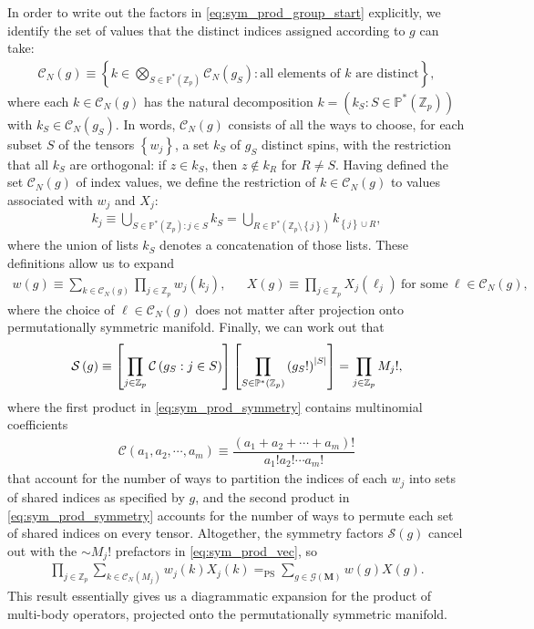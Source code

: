 \documentclass[nofootinbib,notitlepage,11pt]{revtex4-2}
\renewcommand{\t}{\text} %
\newcommand{\f}[2]{\dfrac{#1}{#2}} %
\newcommand{\p}[1]{\left(#1\right)} %
\renewcommand{\sp}[1]{\left[#1\right]} %
\renewcommand{\set}[1]{\left\{#1\right\}} %
\newcommand{\m}{\bm} %
\newcommand{\1}{\mathds{1}}
\newcommand{\C}{\mathcal{C}}
\newcommand{\G}{\mathcal{G}}
\renewcommand{\S}{\mathcal{S}}
\newcommand{\PP}{\mathbb{P}}
\newcommand{\ZZ}{\mathbb{Z}}
\newcommand{\EQPS}{=_{\text{PS}}}
\begin{document}
In order to write out the factors in \eqref{eq:sym_prod_group_start}
explicitly, we identify the set of values that the distinct indices
assigned according to $g$ can take:
\begin{align}
  \C_N\p{g}
  \equiv \set{ k \in \bigotimes_{S\in\PP^*\p{\ZZ_p}} \C_N\p{g_S}
    : \t{all elements of $k$ are distinct} },
  \label{eq:index_values}
\end{align}
where each $k\in\C_N\p{g}$ has the natural decomposition
$k=\p{k_S:S\in\PP^*\p{\ZZ_p}}$ with $k_S\in\C_N\p{g_S}$.  In words,
$\C_N\p{g}$ consists of all the ways to choose, for each subset $S$ of
the tensors $\set{w_j}$, a set $k_S$ of $g_S$ distinct spins, with the
restriction that all $k_S$ are orthogonal: if $z\in k_S$, then
$z\notin k_R$ for $R\ne S$.  Having defined the set $\C_N\p{g}$ of
index values, we define the restriction of $k\in\C_N\p{g}$ to values
associated with $w_j$ and $X_j$:
\begin{align}
  k_j \equiv \bigcup_{S\in\PP^*\p{\ZZ_p} : j\in S} k_S
  = \bigcup_{R\in\PP^*\p{\ZZ_p\setminus\set{j}}} k_{\set{j}\cup R},
\end{align}
where the union of lists $k_S$ denotes a concatenation of those lists.
These definitions allow us to expand
\begin{align}
  w\p{g} \equiv \sum_{k\in\C_N\p{g}} \prod_{j\in\ZZ_p} w_j\p{k_j},
  &&
  X\p{g} \equiv \prod_{j\in\ZZ_p}
  X_j\p{\ell_j}~\t{for some}~\ell\in\C_N\p{g},
  \label{eq:diagram_factors}
\end{align}
where the choice of $\ell\in\C_N\p{g}$ does not matter after
projection onto permutationally symmetric manifold.  Finally, we can
work out that
\begin{align}
  \S\p{g} \equiv \sp{\prod_{j\in\ZZ_p} \C\p{ g_S : j\in S }}
  \sp{\prod_{S\in\PP^*\p{\ZZ_p}} \p{g_S!}^\abs{S}}
  = \prod_{j\in\ZZ_p} M_j!,
  \label{eq:sym_prod_symmetry}
\end{align}
where the first product in \eqref{eq:sym_prod_symmetry} contains
multinomial coefficients
\begin{align}
  \C\p{a_1,a_2,\cdots,a_m}
  \equiv \f{\p{a_1+a_2+\cdots+a_m}!}{a_1!a_2!\cdots a_m!}
\end{align}
that account for the number of ways to partition the indices of each
$w_j$ into sets of shared indices as specified by $g$, and the second
product in \eqref{eq:sym_prod_symmetry} accounts for the number of
ways to permute each set of shared indices on every tensor.
Altogether, the symmetry factors $\S\p{g}$ cancel out with the
$\sim M_j!$ prefactors in \eqref{eq:sym_prod_vec}, so
\begin{align}
  \prod_{j\in\ZZ_p} \sum_{k\in\C_N\p{M_j}} w_j\p{k} X_j\p{k}
  \EQPS \sum_{g\in\G\p{\m M}} w\p{g} X\p{g}.
  \label{eq:sym_prod_group}
\end{align}
This result essentially gives us a diagrammatic expansion for the
product of multi-body operators, projected onto the permutationally
symmetric manifold.
\end{document}
